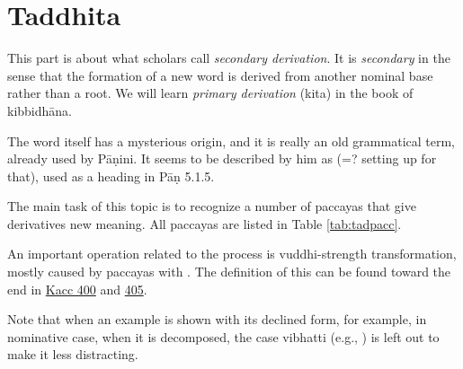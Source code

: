 \chapter{Taddhita}

This part is about what scholars call \emph{secondary derivation}. It is \emph{secondary} in the sense that the formation of a new word is derived from another nominal base rather than a root. We will learn \emph{primary derivation} (kita) in the book of kibbidhāna.

The word  itself has a mysterious origin, and it is really an old grammatical term, already used by Pāṇini. It seems to be described by him as  (=? setting up for that), used as a heading in Pāṇ 5.1.5.

The main task of this topic is to recognize a number of paccayas that give derivatives new meaning. All paccayas are listed in Table \ref{tab:tadpacc}.

An important operation related to the process is vuddhi-strength transformation, mostly caused by paccayas with . The definition of this can be found toward the end in \hyperref[sut:400]{Kacc 400} and \hyperref[sut:405]{405}.

Note that when an example is shown with its declined form, for example, in nominative case, when it is decomposed, the case vibhatti (e.g., ) is left out to make it less distracting.

